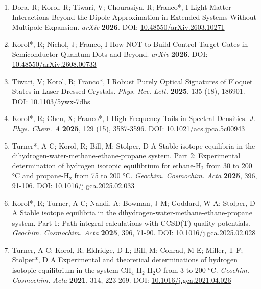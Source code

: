 
\begin{enumerate}
\item[16.] Dora, R; Korol, R; Tiwari, V; Chourasiya, R; Franco*, I Light-Matter Interactions Beyond the Dipole Approximation in Extended Systems Without Multipole Expansion. \textit{arXiv} \textbf{2026}. DOI: \href{https://doi.org/10.48550/arXiv.2603.10271}{10.48550/arXiv.2603.10271}
\vspace{0.1cm}
\item[15.] Korol*, R; Nichol, J; Franco, I How NOT to Build Control-Target Gates in Semiconductor Quantum Dots and Beyond. \textit{arXiv} \textbf{2026}. DOI: \href{https://doi.org/10.48550/arXiv.2608.00733}{10.48550/arXiv.2608.00733}
\vspace{0.1cm}
\item[14.] Tiwari, V; Korol, R; Franco*, I Robust Purely Optical Signatures of Floquet States in Laser-Dressed Crystals. \textit{Phys. Rev. Lett.} \textbf{2025}, 135 (18), 186901. DOI: \href{https://doi.org/10.1103/5ywx-7dbs}{10.1103/5ywx-7dbs}
\vspace{0.1cm}
\item[13.] Korol*, R; Chen, X; Franco*, I High-Frequency Tails in Spectral Densities. \textit{J. Phys. Chem. A} \textbf{2025}, 129 (15), 3587-3596. DOI: \href{https://doi.org/10.1021/acs.jpca.5c00943}{10.1021/acs.jpca.5c00943}
\vspace{0.1cm}
\item[12.] Turner*, A C; Korol, R; Bill, M; Stolper, D A Stable isotope equilibria in the dihydrogen-water-methane-ethane-propane system. Part 2: Experimental determination of hydrogen isotopic equilibrium for ethane-H$_{2}$ from 30 to 200 °C and propane-H$_{2}$ from 75 to 200 °C. \textit{Geochim. Cosmochim. Acta} \textbf{2025}, 396, 91-106. DOI: \href{https://doi.org/10.1016/j.gca.2025.02.033}{10.1016/j.gca.2025.02.033}
\vspace{0.1cm}
\item[11.] Korol*, R; Turner, A C; Nandi, A; Bowman, J M; Goddard, W A; Stolper, D A Stable isotope equilibria in the dihydrogen-water-methane-ethane-propane system. Part 1: Path-integral calculations with CCSD(T) quality potentials. \textit{Geochim. Cosmochim. Acta} \textbf{2025}, 396, 71-90. DOI: \href{https://doi.org/10.1016/j.gca.2025.02.028}{10.1016/j.gca.2025.02.028}
\vspace{0.1cm}
\item[10.] Turner, A C; Korol, R; Eldridge, D L; Bill, M; Conrad, M E; Miller, T F; Stolper*, D A Experimental and theoretical determinations of hydrogen isotopic equilibrium in the system CH$_{4}$-H$_{2}$-H$_{2}$O from 3 to 200 °C. \textit{Geochim. Cosmochim. Acta} \textbf{2021}, 314, 223-269. DOI: \href{https://doi.org/10.1016/j.gca.2021.04.026}{10.1016/j.gca.2021.04.026}

\end{enumerate}
